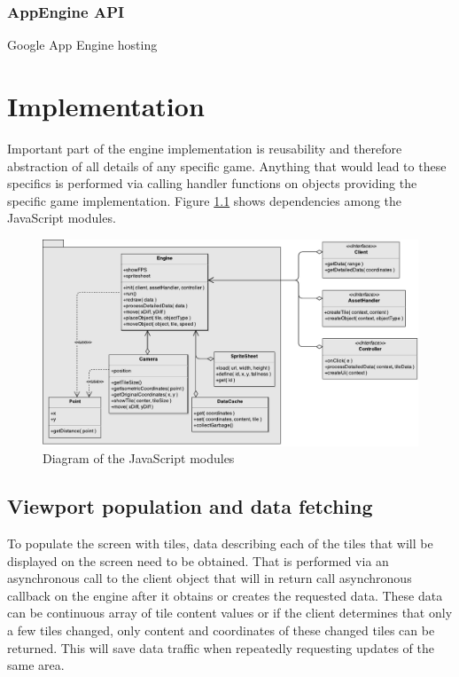 \documentclass[11pt,oneside, final]{fithesis2}
\begin{document}
\subsection{AppEngine API}
Google App Engine hosting

\chapter{Implementation}
\label{implementation}
Important part of the engine implementation is reusability and therefore abstraction of all details of any specific game. Anything that would lead to these specifics is performed via calling handler functions on objects providing the specific game implementation. Figure \ref{classdiagram} shows dependencies among the JavaScript modules.

\begin{figure}[htp]
	\centering
	\includegraphics[width=\textwidth]{thesis-classdiagram}
	\caption{Diagram of the JavaScript modules}
	\label{classdiagram}
\end{figure}

\section{Viewport population and data fetching}
To populate the screen with tiles, data describing each of the tiles that will be displayed on the screen need to be obtained. That is performed via an asynchronous call to the client object that will in return call asynchronous callback on the engine after it obtains or creates the requested data. These data can be continuous array of tile content values or if the client determines that only a few tiles changed, only content and coordinates of these changed tiles can be returned. This will save data traffic when repeatedly requesting updates of the same area.
\end{document}
